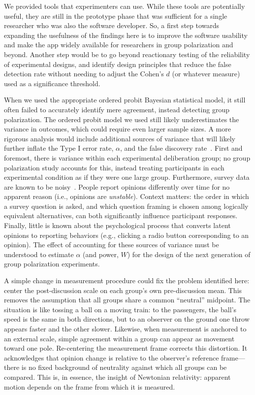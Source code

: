 \documentclass[preview]{article}
\begin{document}
We provided tools that experimenters can use. While these tools are
potentially useful, they are still in the prototype phase that was
sufficient for a single researcher who was also the software developer. So,
a first step towards expanding the usefulness of the findings here is to 
improve the software usability and make the app widely available for
researchers in group polarization and beyond. Another step would be to go
beyond reactionary testing of the reliability of experimental designs, and
identify design principles that reduce the false detection rate without
needing to adjust the Cohen's $d$ (or whatever measure) 
used as a significance threshold. 

When we used the appropriate ordered probit Bayesian statistical model, it
still often failed to accurately identify mere agreement, instead detecting
group polarization.  The ordered probit model we used still likely
underestimates the variance in outcomes, which could require even larger
sample sizes. A more rigorous analysis would include additional sources of
variance that will likely further inflate the Type I error rate, $\alpha$,
and the false discovery rate~\cite{Yarkoni2022}. First and foremost, there is
variance within each experimental deliberation group; no group polarization
study accounts for this, instead treating participants in each experimental
condition as if they were one large group. Furthermore, survey data are known
to be noisy~\cite{Zaller1992}. People report opinions differently over time
for no apparent reason (i.e., opinions are \emph{unstable}).  Context
matters: the order in which a survey question is asked, and which question
framing is chosen among logically equivalent alternatives, can both
significantly influence participant responses. Finally, little is known about
the psychological process that converts latent opinions to reporting
behaviors (e.g., clicking a radio button corresponding to an opinion).  The
effect of accounting for these sources of variance must be understood to
estimate $\alpha$ (and power, $W$) for the design of the next generation of
group polarization experiments. 

A simple change in measurement procedure could fix the problem identified
here: center the post-discussion scale on each group’s own pre-discussion
mean. This removes the assumption that all groups share a common “neutral”
midpoint. The situation is like tossing a ball on a moving train: to the
passengers, the ball’s speed is the same in both directions, but to an
observer on the ground one throw appears faster and the other slower.
Likewise, when measurement is anchored to an external scale, simple agreement
within a group can appear as movement toward one pole. Re-centering the
measurement frame corrects this distortion. It acknowledges that opinion
change is relative to the observer’s reference frame—there is no fixed
background of neutrality against which all groups can be compared. This is,
in essence, the insight of Newtonian relativity: apparent motion depends on
the frame from which it is measured.
\end{document}
